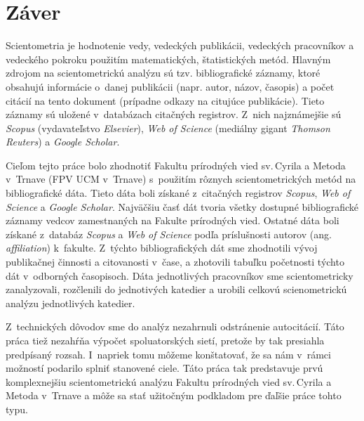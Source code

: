 \chapter*{Záver}

Scientometria je hodnotenie vedy, vedeckých publikácii, vedeckých pracovníkov a
vedeckého pokroku použitím matematických, štatistických metód. Hlavným zdrojom
na scientometrickú analýzu sú tzv. bibliografické záznamy, ktoré obsahujú
informácie o~danej publikácii (napr. autor, názov, časopis) a počet citácií na
tento dokument (prípadne odkazy na citujúce publikácie). Tieto záznamy sú
uložené v~databázach citačných registrov. Z~nich najznámejšie sú \emph{Scopus}
(vydavateľstvo \emph{Elsevier}), \emph{Web of Science} (mediálny gigant
\emph{Thomson Reuters}) a \emph{Google Scholar}.

Cieľom tejto práce bolo zhodnotiť Fakultu prírodných vied sv.\,Cyrila a Metoda
v~Trnave (FPV UCM v~Trnave) s~použitím rôznych scientometrických metód na
bibliografické dáta.  Tieto dáta boli získané z~citačných registrov
\emph{Scopus}, \emph{Web of Science} a \emph{Google Scholar}. Najväčšiu časť
dát tvoria všetky dostupné bibliografické záznamy vedcov zamestnaných na
Fakulte prírodných vied.  Ostatné dáta boli získané z~databáz \emph{Scopus} a
\emph{Web of Science} podľa príslušnosti autorov (ang.  \emph{affiliation})
k~fakulte. Z~týchto bibliografických dát sme zhodnotili vývoj publikačnej
činnosti a citovanosti v~čase, a zhotovili tabuľku početnosti týchto dát
v~odborných časopisoch. Dáta jednotlivých pracovníkov sme scientometricky
zanalyzovali, rozčlenili do jednotivých katedier a urobili celkovú
scienometrickú analýzu jednotlivých katedier. 
 
Z~technických dôvodov sme do analýz nezahrnuli odstránenie autocitácií. Táto
práca tiež nezahŕňa výpočet spoluatorských sietí, pretože by tak presiahla
predpísaný rozsah.  I~napriek tomu môžeme konštatovať, že sa nám v~rámci
možností podarilo splniť stanovené ciele. Táto práca tak predstavuje prvú
komplexnejšiu scientometrickú analýzu Fakultu prírodných vied sv.\,Cyrila a
Metoda v~Trnave a môže sa stať užitočným podkladom pre ďaľšie práce tohto typu. 


